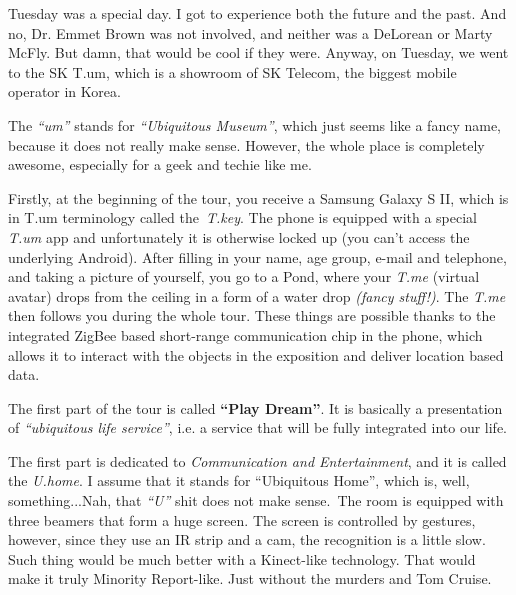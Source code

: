 \begin{post}
	\begin{content}
Tuesday was a special day. I got to experience both the future and the past. And no, Dr. Emmet Brown was not involved, and neither was a DeLorean or Marty McFly. But damn, that would be cool if they were. Anyway, on Tuesday, we went to the SK T.um, which is a showroom of SK Telecom, the biggest mobile operator in Korea.

\begin{figure}
\vspace{-12pt}\centering{}
\vspace{-32pt}
\end{figure}The \textit{``um''} stands for \textit{``Ubiquitous Museum''}, which just seems like a fancy name, because it does not really make sense. However, the whole place is completely awesome, especially for a geek and techie like me.

Firstly, at the beginning of the tour, you receive a Samsung Galaxy S II, which is in T.um terminology called the \textit{T.key}. The phone is equipped with a special \textit{T.um} app and unfortunately it is otherwise locked up (you can't access the underlying Android). After filling in your name, age group, e-mail and telephone, and taking a picture of yourself, you go to a Pond, where your \textit{T.me} (virtual avatar) drops from the ceiling in a form of a water drop \textit{(fancy stuff!)}. The \textit{T.me} then follows you during the whole tour. These things are possible thanks to the integrated ZigBee based short-range communication chip in the phone, which allows it to interact with the objects in the exposition and deliver location based data.

The first part of the tour is called \textbf{``Play Dream''}. It is basically a presentation of \textit{``ubiquitous life service''}, i.e. a service that will be fully integrated into our life.

The first part is dedicated to \textit{Communication and Entertainment}, and it is called the \textit{U.home}. I assume that it stands for ``Ubiquitous Home'', which is, well, something...Nah, that \textit{``U''} shit does not make sense. The room is equipped with three beamers that form a huge screen. The screen is controlled by gestures, however, since they use an IR strip and a cam, the recognition is a little slow. Such thing would be much better with a Kinect-like technology. That would make it truly Minority Report-like. Just without the murders and Tom Cruise.


\end{content}
\end{post}
